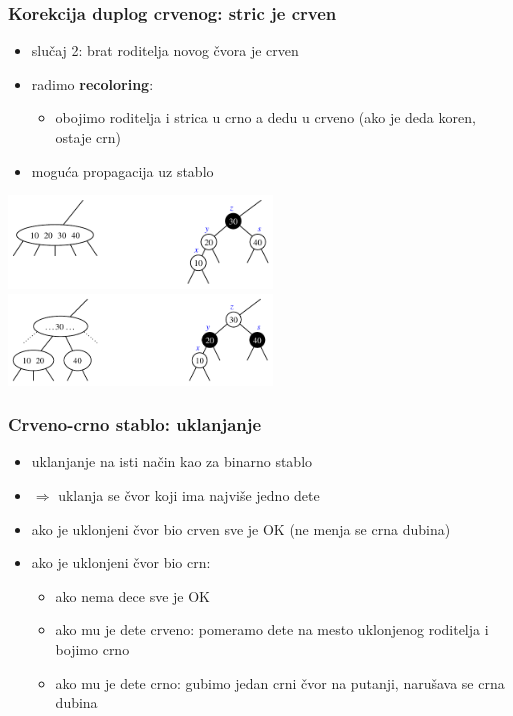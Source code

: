 \documentclass[compress]{beamer}
\begin{document}
\begin{frame}[fragile]
  \frametitle{Korekcija duplog crvenog: stric je crven}
  \begin{itemize}
    \item slučaj 2: brat roditelja novog čvora je crven
    \item radimo \textbf{recoloring}:
    \begin{itemize}
      \item obojimo roditelja i strica u crno a dedu u crveno (ako je deda koren, ostaje crn)
    \end{itemize}
    \item moguća propagacija uz stablo
  \end{itemize}
  \includegraphics[width=7cm]{asp-11-pic40a.pdf} \\
  \includegraphics[width=7cm]{asp-11-pic40b.pdf}
\end{frame}

\begin{frame}[fragile]
  \frametitle{Crveno-crno stablo: uklanjanje}
  \begin{itemize}
    \item uklanjanje na isti način kao za binarno stablo 
    \item $\Rightarrow$ uklanja se čvor koji ima najviše jedno dete
    \item ako je uklonjeni čvor bio crven sve je OK (ne menja se crna dubina)
    \item ako je uklonjeni čvor bio crn:
    \begin{itemize}
      \item ako nema dece sve je OK
      \item ako mu je dete crveno: pomeramo dete na mesto uklonjenog roditelja i bojimo crno
      \item ako mu je dete crno: gubimo jedan crni čvor na putanji, narušava se crna dubina
    \end{itemize}
  \end{itemize}
\end{frame}
\end{document}
